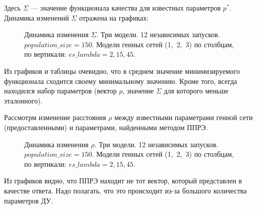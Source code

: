 Здесь $\Sigma$ — значение функционала качества для известных параметров $p^*$.
Динамика изменений $\Sigma$ отражена на графиках:

\begin{figure}[h]
  \center{\texttt{[image: p150]}}
  \caption{Динамика изменения $\Sigma$. Три модели. 12 независимых запусков. 
  $population\_size = 150$. Модели генных сетей (1,~2,~3) по столбцам, 
  по вертикали: $es\_lambda = 2, 15, 45$. }
  \label{img:p150}
\end{figure}

Из графиков и таблицы очевидно, что в среднем значение минимизируемого 
функционала сходится своему минимальному значению. Кроме того, всегда находился 
набор параметров (вектор $p$, значение $\Sigma$ для которого меньше эталонного).

Рассмотрм изменение расстояния $\rho$ между известными параметрами генной сети 
(предоставленными) и параметрами, найденными методом ППРЭ.

\begin{figure}[h]
  \center{\texttt{[image: p150e]}}
  \caption{Динамика изменения $\rho$. Три модели. 12 независимых запусков. 
  $population\_size = 150$. Модели генных сетей (1,~2,~3) по столбцам, 
  по вертикали: $es\_lambda = 2, 15, 45$. }
  \label{img:p150}
\end{figure}

Из графиков видно, что ППРЭ находит не тот вектор, который представлен в 
качестве ответа. Надо полагать, что это происходит из-за большого количества 
параметров ДУ.

% 


\clearpage
